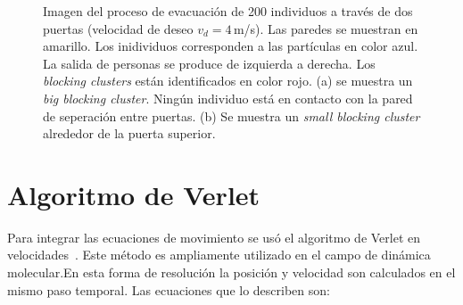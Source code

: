 \begin{figure}[H]
    \centering
    \hfill
    \caption[width=5cm]{Imagen del proceso de evacuación de  200 individuos a través de dos puertas (velocidad de deseo $v_d=4\,$m/s). Las paredes se muestran en amarillo. Los inidividuos corresponden a las partículas en color azul. La salida de personas se produce de izquierda a derecha. Los \textit{blocking clusters} están identificados en color rojo. (a) se muestra un \textit{big blocking cluster}. Ningún individuo está en contacto con la pared de seperación entre puertas. (b)  Se muestra un \textit{small blocking cluster} alrededor de la puerta superior.}
    \label{bc}
\end{figure}


\section{\label{verlet} Algoritmo de Verlet}

Para integrar las ecuaciones de movimiento se usó el algoritmo de Verlet en velocidades~\cite{haile}. Este método es ampliamente utilizado en el campo de dinámica molecular.En esta forma de resolución la posición y velocidad son calculados en el mismo paso temporal. Las ecuaciones que lo describen son:

